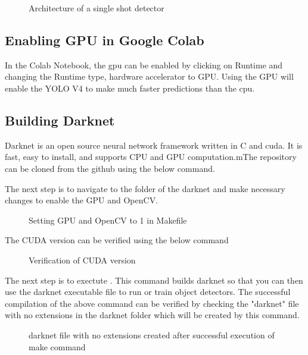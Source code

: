 \begin{figure}[H]
	\centering
	\caption{Architecture of a single shot detector \cite{Bochkovskiy:2020}}
\end{figure}

\subsection{Enabling GPU in Google Colab}

In the Colab Notebook, the \ac{gpu} can be enabled by clicking on Runtime and changing the Runtime type, hardware accelerator to GPU. Using the GPU will enable the YOLO V4 to make much faster predictions than the \ac{cpu}. 

\subsection{Building Darknet}

Darknet is an open source neural network framework written in C and \ac{cuda}. \cite{Bochkovskiy:2020} It is fast, easy to install, and supports CPU and GPU computation.mThe repository can be cloned from the github using the below command.


The next step is to navigate to the folder of the darknet and make necessary changes to enable the GPU and OpenCV.

\begin{figure}[H]
	\centering
	\caption{Setting GPU and OpenCV to 1 in Makefile}
\end{figure}

The CUDA version can be verified using the below command

\begin{figure}[H]
	\centering
	\caption{Verification of CUDA version}
\end{figure}

The next step is to exectute .
This command builds darknet so that you can then use the darknet executable file to run or train object detectors.
The successful compilation of the above command can be verified by checking the "darknet" file with no extensions in the darknet folder  which will be created by this command. 

\begin{figure}[H]
	\centering
	\caption{darknet file with no extensions created after successful execution of make command}
\end{figure}

